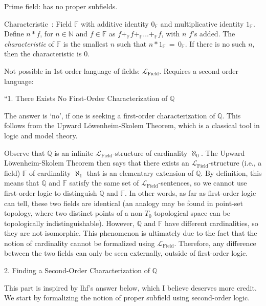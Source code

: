 Prime field: has no proper subfields.

Characteristic~\cite{wiki:FieldMathematics}: 
Field $\mathbb{F}$ with additive identity $0_{\mathbb{F}}$
and multiplicative identity $1_{\mathbb{F}}$.
Define $n \ast f$, for $n \in \mathbb{N}$ and $f \in \mathbb{F}$
as $f +_{\mathbb{F}} f +_{\mathbb{F}} \ldots +_{\mathbb{F}} f$, 
with $n$ $f$'s added.
The \textit{characteristic} of $\mathbb{F}$
is the smallest $n$ such that 
$n \ast 1_{\mathbb{F}} \,=\, 0_{\mathbb{F}}$.
If there is no such $n$, then the characteristic is 
$0$.


Not possible in 1st order language of fields:
$ \mathcal{L}_{\text{Field}} $.
Requires a second order language:


``1. There Exists No First-Order Characterization of $ \mathbb{Q} $

The answer is ‘no’, if one is seeking a first-order 
characterization of $ \mathbb{Q} $. 
This follows from the Upward Löwenheim-Skolem Theorem, 
which is a classical tool in logic and model theory.

Observe that $ \mathbb{Q} $ is an infinite 
$ \mathcal{L}_{\text{Field}} $-structure 
of cardinality $ \aleph_{0} $. 
The Upward L\"{o}wenheim-Skolem Theorem then says that 
there exists an $ \mathcal{L}_{\text{Field}} $-structure 
(i.e., a field) $ \mathbb{F} $ of cardinality $ \aleph_{1} $ 
that is an elementary extension of $ \mathbb{Q} $. 
By definition, this means that $ \mathbb{Q} $ and $ \mathbb{F} $ 
satisfy the same set of $ \mathcal{L}_{\text{Field}} $-sentences, 
so we cannot use first-order logic to distinguish $ \mathbb{Q} $ 
and $ \mathbb{F} $. In other words, as far as first-order logic 
can tell, these two fields are identical
(an analogy may be found in point-set topology,
where two distinct points of a non-$ T_{0} $ topological space 
can be topologically indistinguishable). 
However, $ \mathbb{Q} $ and $ \mathbb{F} $ have different 
cardinalities, so they are not isomorphic. 
This phenomenon is ultimately due to the fact 
that the notion of cardinality cannot be formalized
 using $ \mathcal{L}_{\text{Field}} $. 
 Therefore, any difference between the two fields 
 can only be seen externally, outside of first-order logic.

2. Finding a Second-Order Characterization of $ \mathbb{Q} $

This part is inspired by lhf's answer below, 
which I believe deserves more credit. 
We start by formalizing the notion of proper subfield 
using second-order logic.

